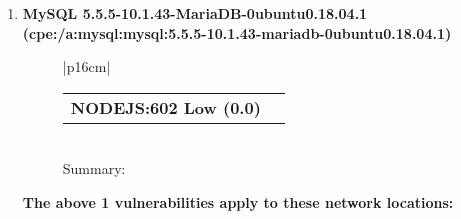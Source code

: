 \documentclass{article}
\begin{document}
\begin{enumerate}[wide, labelwidth=!, labelindent=0pt,
                        label=\textbf{\large \arabic{enumi} \large}]
\begin{figure}[h!]
\begin{tabular}{|p{16cm}|} \begin{tabular}{@{}p{15cm}>{\raggedleft\arraybackslash}
                           p{0.5cm}@{}}\textbf{CVE-2017-1000494 Medium (4.6)} & \href{https://nvd.nist.gov/vuln/detail/CVE-2017-1000494}{\large \faicon{link}}\end{tabular}\\
 Summary:Uninitialized stack variable vulnerability in NameValueParserEndElt (upnpreplyparse.c) in miniupnpd < 2.0 allows an attacker to cause Denial of Service (Segmentation fault and Memory Corruption) or possibly have unspecified other impact\\ \hline \end{tabular}  \end{figure}
\FloatBarrier
\textbf{The above 3 vulnerabilities apply to these network locations:}

                         \begin{itemize}
\item 192.168.0.1 Ports: ['5000']
\\ \\ 
 \end{itemize}
\item \textbf{\large MySQL 5.5.5-10.1.43-MariaDB-0ubuntu0.18.04.1 (cpe:/a:mysql:mysql:5.5.5-10.1.43-mariadb-0ubuntu0.18.04.1)  \large}\begin{figure}[h!]
\begin{tabular}{|p{16cm}|} \begin{tabular}{@{}p{15cm}>{\raggedleft\arraybackslash}
                           p{0.5cm}@{}}\textbf{NODEJS:602 Low (0.0)} & \href{https://nvd.nist.gov/vuln/detail/NODEJS:602}{\large \faicon{link}}\end{tabular}\\
 Summary:\\ \hline \end{tabular}  \end{figure}
\FloatBarrier
\textbf{The above 1 vulnerabilities apply to these network locations:}


\end{enumerate}
\end{document}
